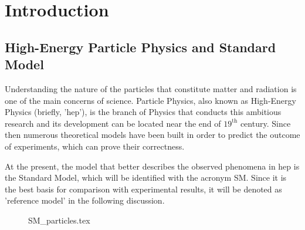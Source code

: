 \mainmatter
\chapter{Introduction}
\label{chap:Introduction}





\section{High-Energy Particle Physics and Standard Model}
Understanding the nature of the particles that constitute matter and radiation is one of the main concerns of science. Particle Physics, also known as High-Energy Physics (briefly, 'hep'), is the branch of Physics that conducts this ambitious research and its development can be located near the end of $19^\mathrm{th}$ century. Since then numerous theoretical models have been built in order to predict the outcome of experiments, which can prove their correctness.

At the present, the model that better describes the observed phenomena in hep is the Standard Model, which will be identified with the acronym SM. Since it is the best basis for comparison with experimental results, it will be denoted as 'reference model' in the following discussion.

\begin{figure}[H]
	\centering
	{SM_particles.tex}
	\label{fig:SM_PARTICLES}
\end{figure}

